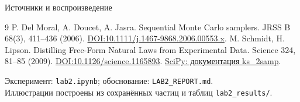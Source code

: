 \documentclass[10pt,aspectratio=169]{beamer}
\begin{document}
\begin{frame}{Источники и воспроизведение}

\small
\begin{thebibliography}{9}
 P. Del Moral, A. Doucet, A. Jasra. Sequential Monte Carlo samplers.
JRSS B 68(3), 411--436 (2006). \href{https://doi.org/10.1111/j.1467-9868.2006.00553.x}{DOI:10.1111/j.1467-9868.2006.00553.x}.
 M. Schmidt, H. Lipson. Distilling Free-Form Natural Laws from Experimental Data.
Science 324, 81--85 (2009). \href{https://doi.org/10.1126/science.1165893}{DOI:10.1126/science.1165893}.
 \href{https://docs.scipy.org/doc/scipy/reference/generated/scipy.stats.ks_2samp.html}{SciPy: документация ks\_2samp}.
\end{thebibliography}
\medskip
Эксперимент: \texttt{lab2.ipynb}; обоснование: \texttt{LAB2\_REPORT.md}.\\
Иллюстрации построены из сохранённых частиц и таблиц \texttt{lab2\_results/}.

\end{frame}
\end{document}
